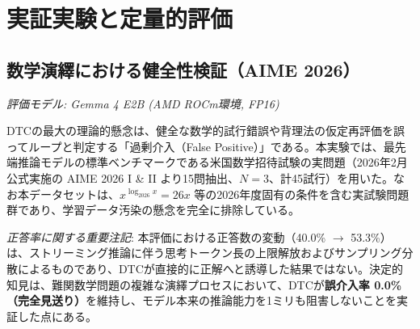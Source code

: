 \documentclass[11pt,a4paper]{article}
\begin{document}
\section{実証実験と定量的評価}

\subsection{数学演繹における健全性検証（AIME 2026）}
\textit{評価モデル: Gemma 4 E2B (AMD ROCm環境, FP16)}

DTCの最大の理論的懸念は、健全な数学的試行錯誤や背理法の仮定再評価を誤ってループと判定する「過剰介入（False Positive）」である。本実験では、最先端推論モデルの標準ベンチマークである米国数学招待試験の実問題（2026年2月公式実施の AIME 2026 I \& II より15問抽出、$N=3$、計45試行）を用いた。なお本データセットは、$x^{\log_{2026} x} = 26x$ 等の2026年度固有の条件を含む実試験問題群であり、学習データ汚染の懸念を完全に排除している。

\begin{table}[htbp]
\centering
\small
\caption{米国数学招待試験（AIME 2026 公式問題 15問, $N=3$）における健全性評価結果。}
\label{tab:aime_ja}
\end{table}

\noindent\textit{正答率に関する重要注記}: 本評価における正答数の変動（40.0\% $\to$ 53.3\%）は、ストリーミング推論に伴う思考トークン長の上限解放およびサンプリング分散によるものであり、DTCが直接的に正解へと誘導した結果ではない。決定的知見は、難関数学問題の複雑な演繹プロセスにおいて、DTCが\textbf{誤介入率 0.0\%（完全見送り）}を維持し、モデル本来の推論能力を1ミリも阻害しないことを実証した点にある。
\end{document}
